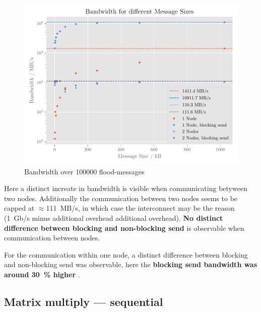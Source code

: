 \documentclass[]{scrartcl}
\begin{document}
\begin{figure}[ht]
    \centering
    \includegraphics[width=\linewidth]{img/bandwidth}
    \caption{Bandwidth over 100000 flood-messages}%
    \label{fig:bandwidth}
\end{figure}

Here a distinct increate in bandwidth is visible when communicating betyween two nodes.
Additionally the communication between two nodes seems to be capped at $\approx$\SI{111}{MB/s}, in which case the interconnect may be the reason (\SI{1}{Gb/s} minus additional overhead additional overhead).
{\bfseries No distinct difference between blocking and non-blocking send} is observable when communication between nodes.

For the communication within one node, a distinct difference between blocking and non-blocking send was observable, here the {\bfseries blocking send bandwidth was around \SI{30}{\%} higher }.
\subsection{Matrix multiply --- sequential}
\end{document}
